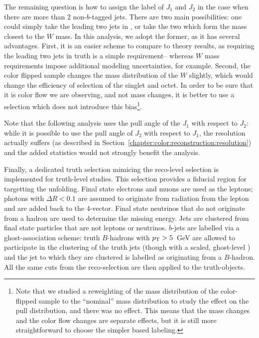 
The remaining question is how to assign the label of $J_1$ and $J_2$ in the case when there are more than 2 non-$b$-tagged jets. There are two main possibilities: one could simply take the leading two jets in \pt, or take the two which form the mass closest to the $W$ mass. In this analysis, we adopt the former, as it has several advantages. First, it is an easier scheme to compare to theory results, as requiring the leading two jets in truth is a simple requirement-- whereas $W$ mass requirements impose additional modeling uncertainties, for example. Second, the color flipped sample changes the mass distribution of the $W$ slightly, which would change the efficiency of selection of the singlet and octet. In order to be sure that it is color flow we are observing, and not mass changes, it is better to use a selection which does not introduce this bias\footnote{Note that we studied a reweighting of the mass distribution of the color-flipped sample to the ``nominal'' mass distribution to study the effect on the pull distribution, and there was no effect. This means that the mass changes and the color flow changes are separate effects, but it is still more straightforward to choose the simpler \pt based labeling.}.

Note that the following analysis uses the pull angle of the $J_1$ with respect to $J_2$: while it is possible to use the pull angle of $J_2$ with respect to $J_1$, the resolution actually suffers (as described in Section~\ref{chapter:color:reconstruction:resolution}) and the added statistics would not strongly benefit the analysis.

Finally, a dedicated truth selection mimicing the reco-level selection is implemented for truth-level studies. This selection provides a fiducial region for targetting the unfolding. Final state electrons and muons are used as the leptons; photons with $\Delta R < 0.1$ are assumed to originate from radiation from the lepton and are added back to the 4-vector. Final state neutrinos that do not originate from a hadron are used to determine the missing energy. Jets are clustered from final state particles that are not leptons or neutrinos. $b$-jets are labelled via a ghost-association scheme: truth $B$-hadrons with $p_{\text{T}} > 5$~GeV are allowed to participate in the clustering of the truth jets (though with a scaled, ghost-level \pt) and the jet to which they are clustered is labelled as originating from a $B$-hadron. All the same cuts from the reco-selection are then applied to the truth-objects.

